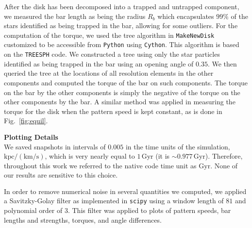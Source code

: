 \documentclass{natureprintstyle}
\begin{document}
After the disk has been decomposed into a trapped and untrapped component, we
measured the bar length as being the radius $R_b$ which encapsulates $99\%$ of
the stars identified as being trapped in the bar, allowing for some outliers.
For the computation of the torque, we used the tree algorithm in
\texttt{MakeNewDisk}\cite{2005MNRAS.361..776S} customized to be accessible
from \texttt{Python} using \texttt{Cython}. This algorithm is based on the
\texttt{TREESPH} code.\cite{1989ApJS...70..419H} We constructed a tree using
only the star particles identified as being trapped in the bar using an
opening angle of $0.35$. We then queried the tree at the locations of all
resolution elements in the other components and computed the torque of the bar
on such components. The torque on the bar by the other components is simply
the negative of the torque on the other components by the bar. A similar
method was applied in measuring the torque for the disk when the pattern speed
is kept constant, as is done in Fig.~\ref{fig:equil}.

\vspace{12pt}

\noindent
{\bf Plotting Details}
\\
\noindent
We saved snapshots in intervals of $0.005$ in the time units of the
simulation, $\textrm{kpc}/(\textrm{km}/\textrm{s})$, which is very nearly
equal to $1\,\textrm{Gyr}$ (it is $\sim0.977\,\textrm{Gyr}$). Therefore,
throughout this work we referred to the native code time unit as
$\textrm{Gyr}$. None of our results are sensitive to this choice.

In order to remove numerical noise in several quantities we computed, we
applied a Savitzky-Golay filter\cite{1964AnaCh..36.1627S} as implemented in
\texttt{scipy} using a window length of $81$ and polynomial order of $3$. This
filter was applied to plots of pattern speeds, bar lengths and strengths,
torques, and angle differences.

% 
\end{document}
